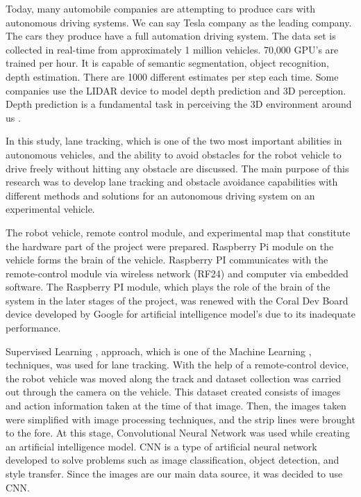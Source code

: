 \documentclass[twocolumn, switch]{article} %
\begin{document}
Today, many automobile companies are attempting to
produce cars with autonomous driving systems. We can say
Tesla company as the leading company. The cars they
produce have a full automation driving system. The data set
is collected in real-time from approximately 1 million
vehicles. 70,000 GPU’s are trained per hour. It is capable of
semantic segmentation, object recognition, depth estimation.
There are 1000 different estimates per step each time. Some
companies use the LIDAR device to model depth prediction
and 3D perception. Depth prediction is a fundamental task in
perceiving the 3D environment around us \cite{casser2019depth}.

In this study, lane tracking, which is one of the two most
important abilities in autonomous vehicles, and the ability to
avoid obstacles for the robot vehicle to drive freely without
hitting any obstacle are discussed. The main purpose of this
research was to develop lane tracking and obstacle avoidance
capabilities with different methods and solutions for an
autonomous driving system on an experimental vehicle.

The robot vehicle, remote control module, and experimental
map that constitute the hardware part of the project were
prepared. Raspberry Pi module on the vehicle forms the
brain of the vehicle. Raspberry PI communicates with the
remote-control module via wireless network (RF24) and
computer via embedded software. The Raspberry PI module,
which plays the role of the brain of the system in the later
stages of the project, was renewed with the Coral Dev Board
\cite{cass2019taking} device developed by Google for artificial intelligence
model’s due to its inadequate performance.

Supervised Learning \cite{caruana2006empirical}, \cite{zhu2009introduction} 
approach, which is one of the
Machine Learning \cite{alpaydin2020introduction}, \cite{schalkoff2007pattern}
techniques, was used for lane
tracking. With the help of a remote-control device, the robot
vehicle was moved along the track and dataset collection was
carried out through the camera on the vehicle. This dataset
created consists of images and action information taken at
the time of that image. Then, the images taken were
simplified with image processing techniques, and the strip
lines were brought to the fore. At this stage, Convolutional
Neural Network \cite{albawi2017understanding} was used while creating an artificial
intelligence model. CNN is a type of artificial neural network
developed to solve problems such as image classification,
object detection, and style transfer. Since the images are our
main data source, it was decided to use CNN.
\end{document}
